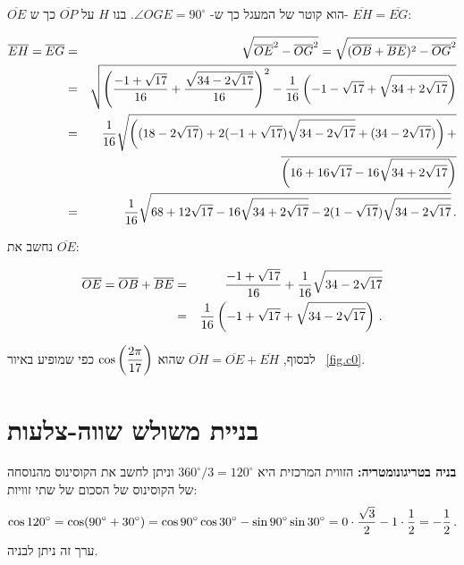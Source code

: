 $\overline{OE}$
הוא קוטר של המעגל כך ש-%
$\angle OGE=90^\circ$.
בנו
$H$
על
$\overline{OP}$
כך ש-%
$\overline{EH}=\overline{EG}$:

\begin{eqnarray*}
\overline{EH}=\overline{EG}&=&\sqrt{\overline{OE}^2-\overline{OG}^2}=\sqrt{(\overline{OB}+\overline{BE})^2-\overline{OG}^2}\\
&=&\sqrt{\left(\displaystyle\frac{-1+\sqrt{17}}{16}+\displaystyle\frac{\sqrt{34-2\sqrt{17}}}{16}\right)^2-
\displaystyle\frac{1}{16}\left(-1-\sqrt{17}+\sqrt{34+2\sqrt{17}}\right)}
\\
&=&\displaystyle\frac{1}{16}\sqrt{\left(
(18-2\sqrt{17})+ 2(-1+\sqrt{17})\sqrt{34-2\sqrt{17}}+
(34-2\sqrt{17})\right)+}\\
&&\quad\quad\quad\overline{
\left(16+16\sqrt{17}-16\sqrt{34+2\sqrt{17}}\right)}\\
&=&\displaystyle\frac{1}{16}\sqrt{
68+12\sqrt{17}-16\sqrt{34+2\sqrt{17}}-2(1-\sqrt{17})\sqrt{34-2\sqrt{17}}
}\,.
\end{eqnarray*}

נחשב את
$\overline{OE}$:

\begin{eqnarray*}
\overline{OE}=\overline{OB}+\overline{BE}&=&\displaystyle\frac{-1+\sqrt{17}}{16}+\displaystyle\frac{1}{16}\sqrt{34-2\sqrt{17}}\\
&=&\displaystyle\frac{1}{16}\left(-1+\sqrt{17}+\sqrt{34-2\sqrt{17}}\right)\,.
\end{eqnarray*}

לבסוף,
$\overline{OH}=\overline{OE}+\overline{EH}$
שהוא
$\cos \left(\displaystyle\frac{2\pi}{17}\right)$
כפי שמופיע באיור~%
\ref{fig.c0}.



\section{בניית משולש שווה-צלעות}\label{a.triangle}


\textbf{בניה בטריגונומטריה:}
הזווית המרכזית היא
$360^\circ/3=120^\circ$ 
וניתן לחשב את הקוסינוס מהנוסחה של הקוסינוס של הסכום של שתי זוויות:
\[
\cos 120^\circ = \cos(90^\circ+30^\circ)=\cos 90^\circ \cos 30^\circ  -\sin 90^\circ \sin 30^\circ = 0\cdot \frac{\sqrt{3}}{2} - 1\cdot \frac{1}{2}=-\displaystyle\frac{1}{2}\,.
\]
ערך זה ניתן לבניה.

